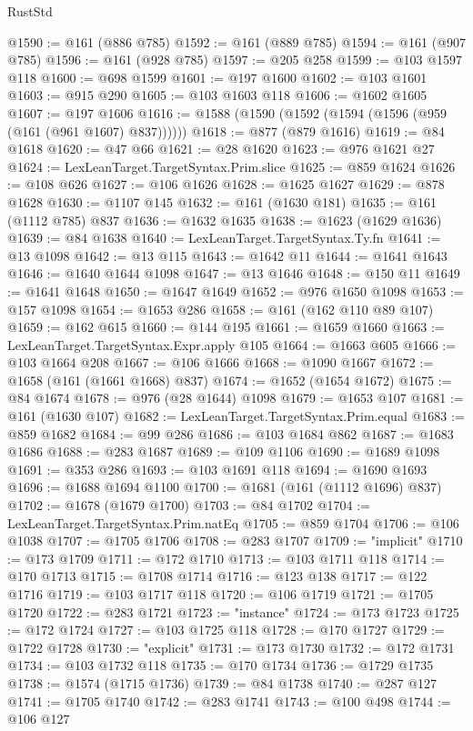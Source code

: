 \begin{lexlean}{RustStd}
\begin{coremodule}
@1590 := @161 (@886 @785)
@1592 := @161 (@889 @785)
@1594 := @161 (@907 @785)
@1596 := @161 (@928 @785)
@1597 := @205 @258
@1599 := @103 @1597 @118
@1600 := @698 @1599
@1601 := @197 @1600
@1602 := @103 @1601
@1603 := @915 @290
@1605 := @103 @1603 @118
@1606 := @1602 @1605
@1607 := @197 @1606
@1616 := @1588 (@1590 (@1592 (@1594 (@1596 (@959 (@161 (@961 @1607) @837))))))
@1618 := @877 (@879 @1616)
@1619 := @84 @1618
@1620 := @47 @66
@1621 := @28 @1620
@1623 := @976 @1621 @27
@1624 := LexLeanTarget.TargetSyntax.Prim.slice
@1625 := @859 @1624
@1626 := @108 @626
@1627 := @106 @1626
@1628 := @1625 @1627
@1629 := @878 @1628
@1630 := @1107 @145
@1632 := @161 (@1630 @181)
@1635 := @161 (@1112 @785) @837
@1636 := @1632 @1635
@1638 := @1623 (@1629 @1636)
@1639 := @84 @1638
@1640 := LexLeanTarget.TargetSyntax.Ty.fn
@1641 := @13 @1098
@1642 := @13 @115
@1643 := @1642 @11
@1644 := @1641 @1643
@1646 := @1640 @1644 @1098
@1647 := @13 @1646
@1648 := @150 @11
@1649 := @1641 @1648
@1650 := @1647 @1649
@1652 := @976 @1650 @1098
@1653 := @157 @1098
@1654 := @1653 @286
@1658 := @161 (@162 @110 @89 @107)
@1659 := @162 @615
@1660 := @144 @195
@1661 := @1659 @1660
@1663 := LexLeanTarget.TargetSyntax.Expr.apply @105
@1664 := @1663 @605
@1666 := @103 @1664 @208
@1667 := @106 @1666
@1668 := @1090 @1667
@1672 := @1658 (@161 (@1661 @1668) @837)
@1674 := @1652 (@1654 @1672)
@1675 := @84 @1674
@1678 := @976 (@28 @1644) @1098
@1679 := @1653 @107
@1681 := @161 (@1630 @107)
@1682 := LexLeanTarget.TargetSyntax.Prim.equal
@1683 := @859 @1682
@1684 := @99 @286
@1686 := @103 @1684 @862
@1687 := @1683 @1686
@1688 := @283 @1687
@1689 := @109 @1106
@1690 := @1689 @1098
@1691 := @353 @286
@1693 := @103 @1691 @118
@1694 := @1690 @1693
@1696 := @1688 @1694 @1100
@1700 := @1681 (@161 (@1112 @1696) @837)
@1702 := @1678 (@1679 @1700)
@1703 := @84 @1702
@1704 := LexLeanTarget.TargetSyntax.Prim.natEq
@1705 := @859 @1704
@1706 := @106 @1038
@1707 := @1705 @1706
@1708 := @283 @1707
@1709 := "implicit"
@1710 := @173 @1709
@1711 := @172 @1710
@1713 := @103 @1711 @118
@1714 := @170 @1713
@1715 := @1708 @1714
@1716 := @123 @138
@1717 := @122 @1716
@1719 := @103 @1717 @118
@1720 := @106 @1719
@1721 := @1705 @1720
@1722 := @283 @1721
@1723 := "instance"
@1724 := @173 @1723
@1725 := @172 @1724
@1727 := @103 @1725 @118
@1728 := @170 @1727
@1729 := @1722 @1728
@1730 := "explicit"
@1731 := @173 @1730
@1732 := @172 @1731
@1734 := @103 @1732 @118
@1735 := @170 @1734
@1736 := @1729 @1735
@1738 := @1574 (@1715 @1736)
@1739 := @84 @1738
@1740 := @287 @127
@1741 := @1705 @1740
@1742 := @283 @1741
@1743 := @100 @498
@1744 := @106 @127

\end{coremodule}
\end{lexlean}
